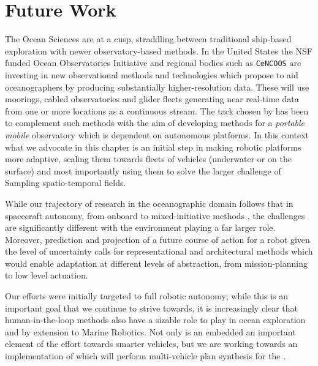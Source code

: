 \section{Future Work}
\label{sec:future}




The Ocean Sciences are at a cusp, straddling between traditional
ship-based exploration with newer observatory-based methods. In the
United States the NSF funded Ocean Observatories Initiative \cite{ooi}
and regional bodies such as \texttt{CeNCOOS} \cite{cencoos} are
investing in new observational methods and technologies which propose
to aid oceanographers by producing substantially higher-resolution
data. These will use moorings, cabled observatories and glider fleets
generating near real-time data from one or more locations as a
continuous stream. The tack chosen by \can has been to complement such
methods with the aim of developing methods for a \emph{portable
  mobile} observatory which is dependent on autonomous platforms. In
this context what we advocate in this chapter is an initial step in
making robotic platforms more adaptive, scaling them towards fleets of
vehicles (underwater or on the surface) and most importantly using
them to solve the larger challenge of Sampling spatio-temporal fields.

While our trajectory of research in the oceanographic domain follows
that in spacecraft autonomy, from onboard \cite{mus98} to
mixed-initiative methods \cite{bresina05}, the challenges are
significantly different with the environment playing a far larger
role. Moreover, prediction and projection of a future course of action
for a robot given the level of uncertainty calls for representational
and architectural methods which would enable adaptation at different
levels of abstraction, from mission-planning to low level actuation. 

Our efforts were initially targeted to full robotic autonomy; while
this is an important goal that we continue to strive towards, it is
increasingly clear that human-in-the-loop methods also have a sizable
role to play in ocean exploration and by extension to Marine
Robotics. Not only is an embedded \rx an important element of the
effort towards smarter vehicles, but we are working towards an
implementation of \rx which will perform multi-vehicle plan synthesis
for the \od.


